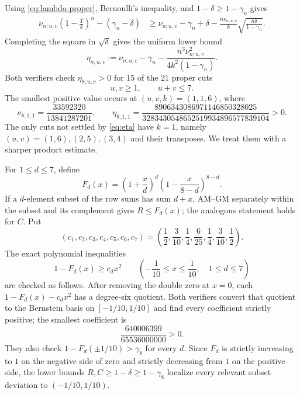 \documentclass[11pt]{article}
\theoremstyle{remark}
\begin{document}
Using \eqref{eq:lambda-proper}, Bernoulli's inequality, and
$1-\delta\ge1-\gamma_n$ gives
\begin{align*}
 \nu_{n;u,v}\left(1-\frac Tk\right)^n-(\gamma_n-\delta)
 &\ge \nu_{n;u,v}-\gamma_n+\delta
 -\frac{n\nu_{n;u,v}}k
  \sqrt{\frac{n\delta}{1-\gamma_n}}.
\end{align*}
Completing the square in $\sqrt\delta$ gives the uniform lower bound
\begin{equation}\label{eq:eta}
 \eta_{n;u,v}
 :=\nu_{n;u,v}-\gamma_n
 -\frac{n^3\nu_{n;u,v}^2}{4k^2(1-\gamma_n)}.
\end{equation}
Both verifiers check $\eta_{8;u,v}>0$ for 15 of the 21 proper cuts
\[
 u,v\ge1,\qquad u+v\le7.
\]
The smallest positive value occurs at $(u,v,k)=(1,1,6)$, where
\[
 \nu_{8;1,1}=\frac{33592320}{13841287201},
 \qquad
 \eta_{8;1,1}=
 \frac{8906343086971146850328025}
 {3283430548652519934896577839104}>0.
\]
The only cuts not settled by \eqref{eq:eta} have $k=1$, namely
$(u,v)=(1,6),(2,5),(3,4)$ and their transposes.  We treat them with a
sharper product estimate.

For $1\le d\le7$, define
\begin{equation}\label{eq:Fd}
 F_d(x)=\left(1+\frac{x}{d}\right)^d
        \left(1-\frac{x}{8-d}\right)^{8-d}.
\end{equation}
If a $d$-element subset of the row sums has sum $d+x$, AM--GM separately
within the subset and its complement gives $R\le F_d(x)$; the analogous
statement holds for $C$.  Put
\begin{equation}\label{eq:cd}
 (c_1,c_2,c_3,c_4,c_5,c_6,c_7)
 =\left(\frac12,\frac3{10},\frac14,\frac6{25},
        \frac14,\frac3{10},\frac12\right).
\end{equation}
The exact polynomial inequalities
\begin{equation}\label{eq:subset-deficit}
 1-F_d(x)\ge c_dx^2
 \qquad\left(-\frac1{10}\le x\le\frac1{10},\quad1\le d\le7\right)
\end{equation}
are checked as follows.  After removing the double zero at $x=0$, each
$1-F_d(x)-c_dx^2$ has a degree-six quotient.  Both verifiers convert that
quotient to the Bernstein basis on $[-1/10,1/10]$ and find every coefficient
strictly positive; the smallest coefficient is
\[
 \frac{640006399}{65536000000}>0.
\]
They also check $1-F_d(\pm1/10)>\gamma_8$ for every $d$.  Since $F_d$ is
strictly increasing to $1$ on the negative side of zero and strictly
decreasing from $1$ on the positive side, the lower bounds
$R,C\ge1-\delta\ge1-\gamma_8$ localize every relevant subset deviation to
$(-1/10,1/10)$.
\end{document}
